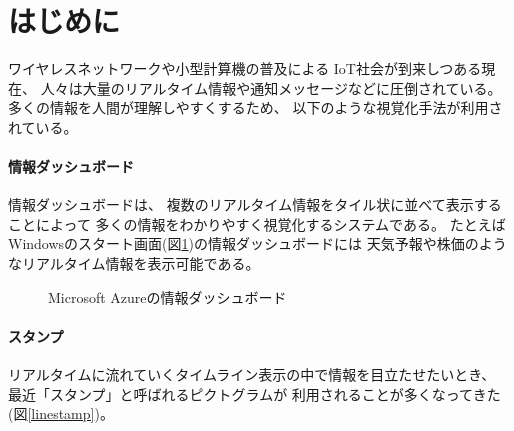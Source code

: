 \section{はじめに}


ワイヤレスネットワークや小型計算機の普及による
IoT社会が到来しつある現在、
人々は大量のリアルタイム情報や通知メッセージなどに圧倒されている。
%
多くの情報を人間が理解しやすくするため、
以下のような視覚化手法が利用されている。

\vspace{3mm}

\paragraph*{情報ダッシュボード}

情報ダッシュボード\cite{few}は、
複数のリアルタイム情報をタイル状に並べて表示することによって
多くの情報をわかりやすく視覚化するシステムである。
たとえばWindowsのスタート画面(図\ref{azure})の情報ダッシュボードには
天気予報や株価のようなリアルタイム情報を表示可能である。

\begin{figure}[h]
\centering{}
\caption{Microsoft Azureの情報ダッシュボード}
\label{azure}
\end{figure}

\vspace{2mm}
\paragraph*{スタンプ}

リアルタイムに流れていくタイムライン表示の中で情報を目立たせたいとき、
最近「スタンプ」と呼ばれるピクトグラムが
利用されることが多くなってきた(図\ref{linestamp})。

